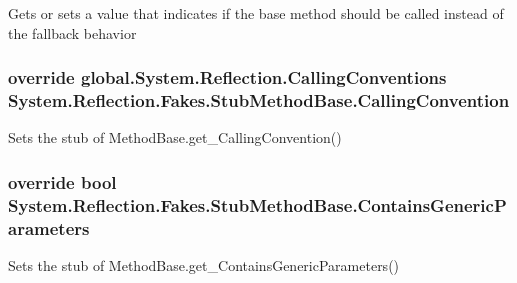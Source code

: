 Gets or sets a value that indicates if the base method should be called instead of the fallback behavior

\hypertarget{class_system_1_1_reflection_1_1_fakes_1_1_stub_method_base_a870d33617e9821dfba872fe635237abd}{
\subsubsection[{Calling\-Convention}]{\setlength{\rightskip}{0pt plus 5cm}override global.\-System.\-Reflection.\-Calling\-Conventions System.\-Reflection.\-Fakes.\-Stub\-Method\-Base.\-Calling\-Convention\hspace{0.3cm}{\ttfamily [get]}}}\label{class_system_1_1_reflection_1_1_fakes_1_1_stub_method_base_a870d33617e9821dfba872fe635237abd}


Sets the stub of Method\-Base.\-get\-\_\-\-Calling\-Convention()

\hypertarget{class_system_1_1_reflection_1_1_fakes_1_1_stub_method_base_a1cad6a1a4478c502092dc3c3b35e4345}{
\subsubsection[{Contains\-Generic\-Parameters}]{\setlength{\rightskip}{0pt plus 5cm}override bool System.\-Reflection.\-Fakes.\-Stub\-Method\-Base.\-Contains\-Generic\-Parameters\hspace{0.3cm}{\ttfamily [get]}}}\label{class_system_1_1_reflection_1_1_fakes_1_1_stub_method_base_a1cad6a1a4478c502092dc3c3b35e4345}


Sets the stub of Method\-Base.\-get\-\_\-\-Contains\-Generic\-Parameters()


